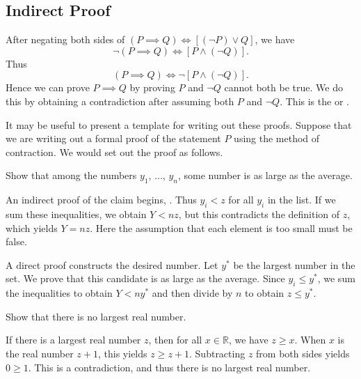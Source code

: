 \subsection{Indirect Proof}

After negating both sides of $(P\implies Q) \iff [(\neg P)\vee Q]$, we have
\[ 
\neg (P\implies Q) \iff [P\wedge (\neg Q)].
\]
Thus
\[ 
(P\implies Q) \iff \neg [P\wedge (\neg Q)].
\]
Hence we can prove $P\implies Q$ by proving $P$ and $\neg Q$ cannot both be true.
We do this by obtaining a contradiction after assuming both $P$ and $\neg Q$.
This is the  or .

It may be useful to present a template for writing out these proofs.
Suppose that we are writing out a formal proof of the statement $P$
using the method of contraction.
We would set out the proof as follows.


\begin{eg}
Show that among the numbers $y_1$, $\ldots$, $y_n$, some number is as large as the average.
\end{eg}
\begin{sol}
An indirect proof of the claim begins,
.
Thus $y_i < z$ for all $y_i$ in the list.
If we sum these inequalities, we obtain
$Y < nz$,
but this contradicts the definition of $z$, which yields
$Y=nz$.
Here the assumption that each element is too small must be false.

A direct proof constructs the desired number.
Let $y^*$ be the largest number in the set.
We prove that this candidate is as large as the average.
Since $y_i \leq y^*$, we sum the inequalities to obtain $Y<ny^*$
and then divide by $n$ to obtain $z\leq y^*$.
\end{sol}



\begin{eg}
Show that there is no largest real number.
\end{eg}
\begin{sol}
If there is a largest real number $z$, then for all $x\in\mathbb{R}$, we have $z\geq x$.
When $x$ is the real number $z+1$, this yields $z\geq z+1$.
Subtracting $z$ from both sides yields $0\geq 1$.
This is a contradiction, and thus there is no largest real number.
\end{sol}



